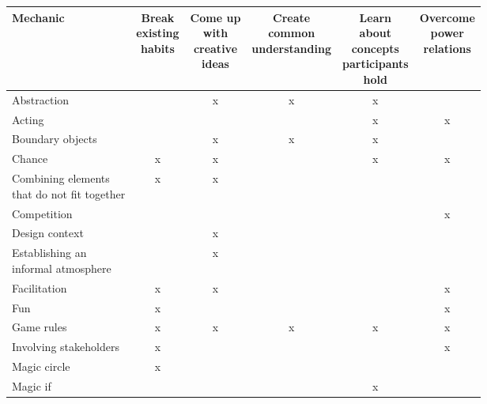 \documentclass[draft,twoside]{vutinfth}
\begin{document}
    \begin{table}
        \begin{tabular}{l|ccccc}
            \toprule
                Mechanic
                & \makecell{Break\\existing\\habits}
                & \makecell{Come up\\with\\creative\\ideas}
                & \makecell{Create\\common\\understanding}
                & \makecell{Learn\\about\\concepts\\participants\\hold}
                & \makecell{Overcome\\power\\relations} \\
            \midrule
                Abstraction             &   & x & x & x &   \\
                Acting                  &   &   &   & x & x \\
                Boundary objects        &   & x & x & x &   \\
                Chance                  & x & x &   & x & x \\
                \makecell[l]{Combining elements\\that do not fit together} & x & x &   &   &   \\
                Competition             &   &   &   &   & x \\
                Design context          &   & x &   &   &   \\
                \makecell[l]{Establishing an\\informal atmosphere} &   & x &   &   &   \\
                Facilitation            & x & x &   &   & x \\
                Fun                     & x &   &   &   & x \\
                Game rules              & x & x & x & x & x \\
                Involving stakeholders  & x &   &   &   & x \\
                Magic circle            & x &   &   &   &   \\
                Magic if                &   &   &   & x &   \\

\end{tabular}
\end{table}
\end{document}
